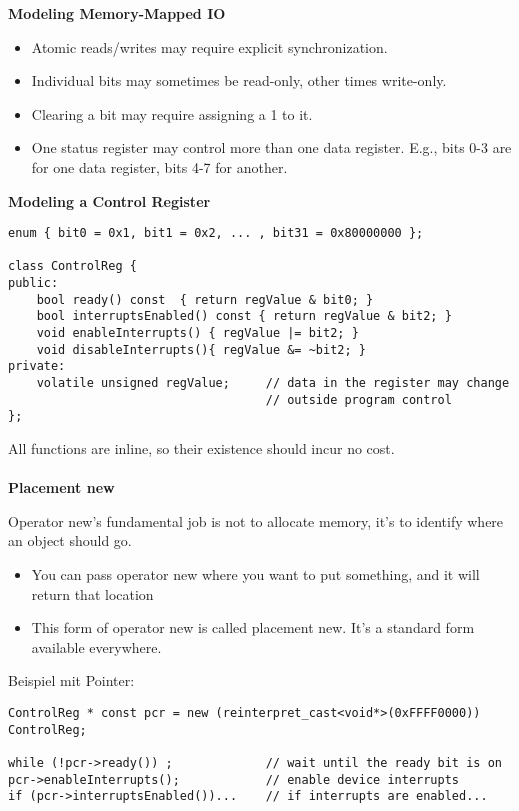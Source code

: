 \textbf{Modeling Memory-Mapped IO}
\begin{itemize}
	\item Atomic reads/writes may require explicit synchronization.
	\item Individual bits may sometimes be read-only, other times write-only.
	\item Clearing a bit may require assigning a 1 to it.
	\item One status register may control more than one data register.
		E.g., bits 0-3 are for one data register, bits 4-7 for another.	
\end{itemize}

\textbf{Modeling a Control Register}

\begin{lstlisting}
enum { bit0 = 0x1, bit1 = 0x2, ... , bit31 = 0x80000000 };

class ControlReg {
public:
	bool ready() const 	{ return regValue & bit0; }
	bool interruptsEnabled() const { return regValue & bit2; }
	void enableInterrupts() { regValue |= bit2; }
	void disableInterrupts(){ regValue &= ~bit2; }
private:
	volatile unsigned regValue;		// data in the register may change
									// outside program control
};
\end{lstlisting}

All functions are inline, so their existence should incur no cost.\\ \\

\textbf{Placement new}

Operator new’s fundamental job is not to allocate memory, it’s to identify where an object should go.

\begin{itemize}
	\item You can pass operator new where you want to put something, and it will return that location
	\item This form of operator new is called placement new.
			It’s a standard form available everywhere.
	
\end{itemize}

Beispiel mit Pointer:
\begin{lstlisting}
ControlReg * const pcr = new (reinterpret_cast<void*>(0xFFFF0000)) ControlReg;

while (!pcr->ready()) ; 			// wait until the ready bit is on
pcr->enableInterrupts(); 			// enable device interrupts
if (pcr->interruptsEnabled())... 	// if interrupts are enabled...

\end{lstlisting}

